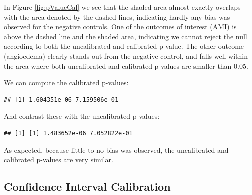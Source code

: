 \documentclass[11pt]{book}
\newenvironment{Shaded}{\begin{snugshade}}{\end{snugshade}}
\newcommand{\KeywordTok}[1]{\textcolor[rgb]{0.13,0.29,0.53}{\textbf{#1}}}
\newcommand{\DataTypeTok}[1]{\textcolor[rgb]{0.13,0.29,0.53}{#1}}
\newcommand{\StringTok}[1]{\textcolor[rgb]{0.31,0.60,0.02}{#1}}
\newcommand{\OperatorTok}[1]{\textcolor[rgb]{0.81,0.36,0.00}{\textbf{#1}}}
\newcommand{\NormalTok}[1]{#1}
\theoremstyle{definition}
\theoremstyle{definition}
\theoremstyle{definition}
\theoremstyle{remark}
\begin{document}
In Figure \ref{fig:pValueCal} we see that the shaded area almost exactly
overlaps with the area denoted by the dashed lines, indicating hardly
any bias was observed for the negative controls. One of the outcomes of
interest (AMI) is above the dashed line and the shaded area, indicating
we cannot reject the null according to both the uncalibrated and
calibrated p-value. The other outcome (angioedema) clearly stands out
from the negative control, and falls well within the area where both
uncalibrated and calibrated p-values are smaller than 0.05.

We can compute the calibrated p-values:

\begin{Shaded}
\end{Shaded}

\begin{verbatim}
## [1] 1.604351e-06 7.159506e-01
\end{verbatim}

And contrast these with the uncalibrated p-values:

\begin{Shaded}
\end{Shaded}

\begin{verbatim}
## [1] [1] 1.483652e-06 7.052822e-01
\end{verbatim}

As expected, because little to no bias was observed, the uncalibrated
and calibrated p-values are very similar.

\subsection{Confidence Interval
Calibration}\label{confidence-interval-calibration-1}
\end{document}
